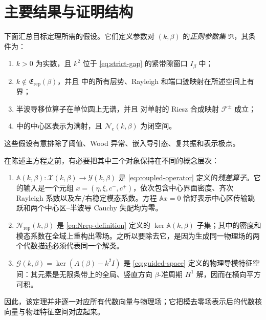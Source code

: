 \section{主要结果与证明结构}
\label{sec:main-results}

下面汇总目标定理所需的假设。它们定义参数对 $(k,\beta)$ 的\emph{正则参数集} $\mathfrak R$，其条件为：
\begin{enumerate}[label=(R\arabic*),leftmargin=2.8em]
  \item $k>0$ 为实数，且 $k^2$ 位于 \eqref{eq:strict-gap} 的紧带隙窗口 $I_\beta$ 中；
  \item $k\notin\mathfrak E_{\mathrm{rep}}(\beta)$，并且 中的所有层势、Rayleigh 和端口迹映射在所述空间上有界；
  \item 半波导移位算子在单位圆上无谱，并且 对单射的 Riesz 合成映射 $\mathcal F^\pm$ 成立；
  \item {} 中的中心区表示为满射，且 $\mathcal N_{\mathrm c}(k,\beta)$ 为闭空间。
\end{enumerate}
这些假设有意排除了阈值、Wood 异常、嵌入导引态、复共振和表示极点。

在陈述主方程之前，有必要把其中三个对象保持在不同的概念层次：
\begin{enumerate}[label=(\alph*),leftmargin=2.2em]
  \item $\mathbb A(k,\beta):\mathcal X(k,\beta)\to\mathcal Y(k,\beta)$ 是 \eqref{eq:coupled-operator} 定义的\emph{残差算子}。它的输入是一个元组 $x=(\eta,\xi,c^-,c^+)$，依次包含中心界面密度、齐次 Rayleigh 系数以及左/右稳定模态系数。方程 $\mathbb A x=0$ 恰好表示中心区传输跳跃和两个中心区--半波导 Cauchy 失配均为零。
  \item $\mathcal N_{\mathrm{rep}}(k,\beta)$ 是 \eqref{eq:Nrep-definition} 定义的 $\ker\mathbb A(k,\beta)$ 子集；其中的密度和模态系数在全域上重构出零场。之所以要除去它，是因为生成同一物理场的两个代数描述必须代表同一个解类。
  \item $\mathcal G(k,\beta)=\ker(A(\beta)-k^2I)$ 是 \eqref{eq:guided-space} 定义的物理导模特征空间：其元素是无限条带上的全局、竖直方向 $\beta$-准周期 $H^1$ 解，因而在横向平方可积。
\end{enumerate}
因此，该定理并非逐一对应所有代数向量与物理场；它把模去零场表示后的代数核向量与物理特征空间对应起来。

